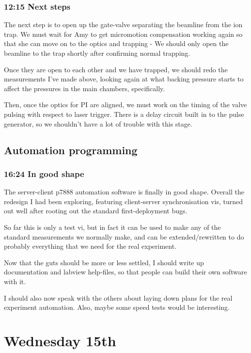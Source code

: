 \documentclass[11pt]{article}
\begin{document}
\subsubsection*{12:15 Next steps}
\label{sec-4-1-2}

The next step is to open up the gate-valve separating the beamline
from the ion trap. We must wait for Amy to get micromotion
compensation working again so that she can move on to the optics and
trapping - We should only open the beamline to the trap shortly after
confirming normal trapping. 

Once they are open to each other and we have trapped, we should redo
the measurements I've made above, looking again at what backing
pressure starts to affect the pressures in the main chambers,
specifically. 

Then, once the optics for PI are aligned, we must work on the timing
of the valve pulsing with respect to laser trigger. There is a delay
circuit built in to the pulse generator, so we shouldn't have a lot of
trouble with this stage. 
\subsection*{Automation programming}
\label{sec-4-2}
\subsubsection*{16:24 In good shape}
\label{sec-4-2-1}

The server-client p7888 automation software is finally in good
shape. Overall the redesign I had been exploring, featuring
client-server synchronisation vis, turned out well after rooting out
the standard first-deployment bugs. 

So far this is only a test vi, but in fact it can be used to make any
of the standard measurements we normally make, and can be
extended/rewritten to do probably everything that we need for the real
experiment. 

Now that the guts should be more or less settled, I should write up
documentation and labview help-files, so that people can build their
own software with it.

I should also now speak with the others about laying down plans for
the real experiment automation. Also, maybe some speed tests would be
interesting. 
\section*{Wednesday 15th}
\label{sec-5}
\end{document}
